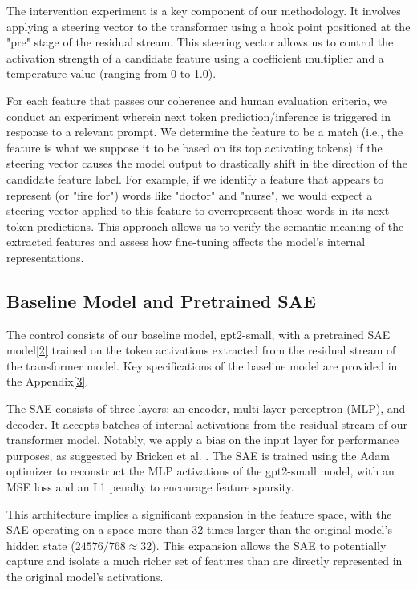 The intervention experiment is a key component of our methodology. It involves applying a steering vector to the transformer using a hook point positioned at the "pre" stage of the residual stream. This steering vector allows us to control the activation strength of a candidate feature using a coefficient multiplier and a temperature value (ranging from 0 to 1.0).

For each feature that passes our coherence and human evaluation criteria, we conduct an experiment wherein next token prediction/inference is triggered in response to a relevant prompt. We determine the feature to be a match (i.e., the feature is what we suppose it to be based on its top activating tokens) if the steering vector causes the model output to drastically shift in the direction of the candidate feature label. For example, if we identify a feature that appears to represent (or "fire for") words like "doctor" and "nurse", we would expect a steering vector applied to this feature to overrepresent those words in its next token predictions. This approach allows us to verify the semantic meaning of the extracted features and assess how fine-tuning affects the model's internal representations.

\subsection{Baseline Model and Pretrained SAE}

The control consists of our baseline model, gpt2-small, with a pretrained SAE model\hyperlink{baseline-details}{[2]} trained on the token activations extracted from the residual stream of the transformer model. Key specifications of the baseline model are provided in the Appendix\hyperlink{gpt2-specs}{[3]}.

The SAE consists of three layers: an encoder, multi-layer perceptron (MLP), and decoder. It accepts batches of internal activations from the residual stream of our transformer model. Notably, we apply a bias on the input layer for performance purposes, as suggested by Bricken et al. \cite{bricken2023monosemanticity}. The SAE is trained using the Adam optimizer to reconstruct the MLP activations of the gpt2-small model, with an MSE loss and an L1 penalty to encourage feature sparsity.

This architecture implies a significant expansion in the feature space, with the SAE operating on a space more than 32 times larger than the original model's hidden state ($24576 / 768 \approx 32$). This expansion allows the SAE to potentially capture and isolate a much richer set of features than are directly represented in the original model's activations.

